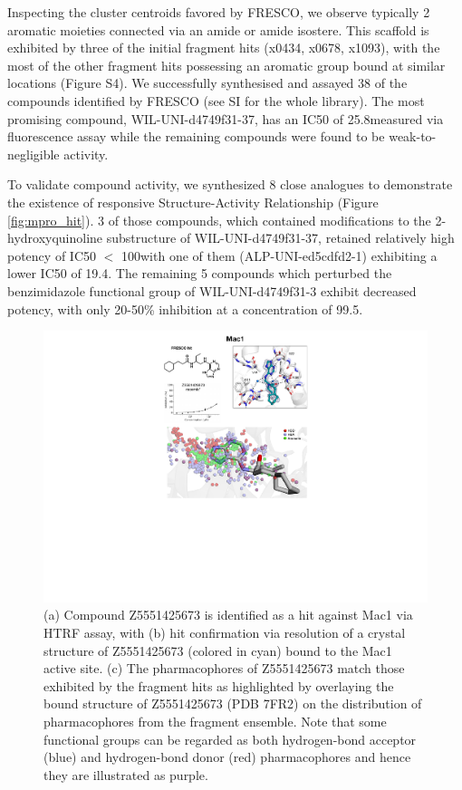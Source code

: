 
Inspecting the cluster centroids favored by FRESCO, we observe typically 2 aromatic moieties connected via an amide or amide isostere. This scaffold is exhibited by three of the initial fragment hits (x0434, x0678, x1093), with the most of the other fragment hits possessing an aromatic group bound at similar locations (Figure S4). We successfully synthesised and assayed 38 of the compounds identified by FRESCO (see SI for the whole library). The most promising compound, WIL-UNI-d4749f31-37, has an IC50 of 25.8\uM measured via fluorescence assay while the remaining compounds were found to be weak-to-negligible activity.

To validate compound activity, we synthesized 8 close analogues to demonstrate the existence of responsive Structure-Activity Relationship  \cite{Hermann2013ZincImpurity, Morreale2017ZincImpurity} (Figure \ref{fig:mpro_hit}). 3 of those compounds, which contained modifications to the 2-hydroxyquinoline substructure of WIL-UNI-d4749f31-37, retained relatively high potency of IC50 $<$ 100\uM with one of them (ALP-UNI-ed5cdfd2-1) exhibiting a lower IC50 of 19.4\uM. The remaining 5 compounds which perturbed the benzimidazole functional group of WIL-UNI-d4749f31-3 exhibit decreased potency, with only 20-50\% inhibition at a concentration of 99.5\uM.

\begin{figure}
    \centering
    \includegraphics[width=0.75\linewidth]{Chapters/Fresco/Figs/mac1_fig.pdf}
    \caption{(a) Compound Z5551425673 is identified as a hit against Mac1 via HTRF assay, with (b) hit confirmation via resolution of a crystal structure of Z5551425673 (colored in cyan) bound to the Mac1 active site. (c) The pharmacophores of Z5551425673 match those exhibited by the fragment hits as highlighted by overlaying the bound structure of Z5551425673 (PDB 7FR2) on the distribution of pharmacophores from the fragment ensemble. Note that some functional groups can be regarded as both hydrogen-bond acceptor (blue) and hydrogen-bond donor (red) pharmacophores and hence they are illustrated as purple.}
    \label{fig:mac1_hit}
\end{figure}

